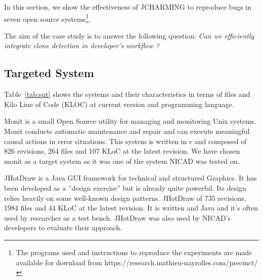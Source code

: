 \documentclass[conference]{IEEEtran}
\begin{document}
In this section, we show the effectiveness of JCHARMING to
reproduce bugs in seven open source systems\footnote{The programs used and instructions to reproduce the experiments are made available for download from https://research.mathieu-nayrolles.com/precinct/}.

The aim of the case study is to answer the following question: \textit{Can we efficiently integrate clone detection in developer's workflow ?}

\subsection{Targeted System}
\label{sub:Targeted System}

Table~\ref{tab:sut} shows the systems and their characteristics in terms of files and Kilo Line of Code (KLOC) at current version and programming language.

\begin{table}[]
\centering
\caption{List of Target Systems in Terms of Files and Kilo Line of Code (KLOC) at current version and Language}
\label{tab:sut}
\end{table}

Monit is a small Open Source utility for managing and monitoring Unix systems.
Monit conducts automatic maintenance and repair and can execute meaningful causal actions in error situations.
This system is written in c and composed of 826 revisions, 264 files and 107 KLoC at the latest revision.
We have chosen monit as a target system as it was one of the system NICAD was tested on.

JHotDraw is a Java GUI framework for technical and structured Graphics.
It has been developed as a ''design exercise'' but is already quite powerful. Its design relies heavily on some well-known design patterns.
JHotDraw of 735 revisions, 1984 files and 44 KLoC at the latest revision.
It is written and Java and it's often used by researcher as a test bench.
JHotDraw was also used by NICAD's developers to evaluate their approach.
\end{document}
